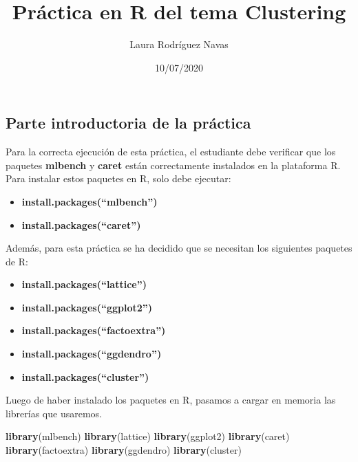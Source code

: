 \documentclass[]{article}
\title{Práctica en R del tema Clustering}
\author{Laura Rodríguez Navas}
\date{10/07/2020}
\newenvironment{Shaded}{\begin{snugshade}}{\end{snugshade}}
\newcommand{\KeywordTok}[1]{\textcolor[rgb]{0.13,0.29,0.53}{\textbf{#1}}}
\newcommand{\NormalTok}[1]{#1}
\providecommand{\tightlist}{%
  \setlength{\itemsep}{0pt}\setlength{\parskip}{0pt}}
\begin{document}
\maketitle

\hypertarget{parte-introductoria-de-la-pruxe1ctica}{%
\subsection{Parte introductoria de la
práctica}\label{parte-introductoria-de-la-pruxe1ctica}}

Para la correcta ejecución de esta práctica, el estudiante debe
verificar que los paquetes \textbf{mlbench} y \textbf{caret} están
correctamente instalados en la plataforma R. Para instalar estos
paquetes en R, solo debe ejecutar:

\begin{itemize}
\tightlist
\item
  \textbf{install.packages(``mlbench'')}
\item
  \textbf{install.packages(``caret'')}
\end{itemize}

Además, para esta práctica se ha decidido que se necesitan los
siguientes paquetes de R:

\begin{itemize}
\tightlist
\item
  \textbf{install.packages(``lattice'')}
\item
  \textbf{install.packages(``ggplot2'')}
\item
  \textbf{install.packages(``factoextra'')}
\item
  \textbf{install.packages(``ggdendro'')}
\item
  \textbf{install.packages(``cluster'')}
\end{itemize}

Luego de haber instalado los paquetes en R, pasamos a cargar en memoria
las librerías que usaremos.

\begin{Shaded}
\begin{Highlighting}[]
\KeywordTok{library}\NormalTok{(mlbench)}
\KeywordTok{library}\NormalTok{(lattice)}
\KeywordTok{library}\NormalTok{(ggplot2)}
\KeywordTok{library}\NormalTok{(caret)}
\KeywordTok{library}\NormalTok{(factoextra)}
\KeywordTok{library}\NormalTok{(ggdendro)}
\KeywordTok{library}\NormalTok{(cluster)}
\end{Highlighting}
\end{Shaded}
\end{document}
